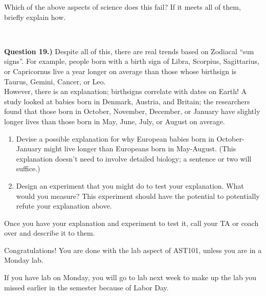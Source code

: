 \documentclass[11pt]{article}
\begin{document}
Which of the above aspects of science does this fail? If it meets all of them, briefly explain how.

\vfill
\hrulefill\\
\newpage


\textbf{Question 19.)} Despite all of this, there {\it} are real trends based on Zodiacal ``sun signs''. For example, people born with a birth sign of Libra, Scorpius, Sagittarius, or Capricornus live a year longer on average than those whose birthsign is Taurus, Gemini, Cancer, or Leo.\\

However, there is an explanation; birthsigns correlate with dates on Earth! A study looked at babies born in Denmark, Austria, and Britain; the researchers found that those born in October, November, December, or January have slightly longer lives than those born in May, June, July, or August on average.



\bigskip


\begin{enumerate}
	\item Devise a possible explanation for why European babies born in October-January might live longer than Europeans born in May-August. (This explanation doesn't need to involve detailed biology; a sentence or two will suffice.)
	\item Design an experiment that you might do to test your explanation. What would you measure? This experiment should have the potential to potentially refute your explanation above.
\end{enumerate}

Once you have your explanation and experiment to test it, call your TA or coach over and describe it to them. 


\vspace{3in}

\vspace{1.5cm}
\hrulefill

\bfseries

Congratulations! You are done with the lab aspect of AST101, unless you are in a Monday lab.

If you have lab on Monday, you will go to lab next week to make up the lab you missed earlier in the semester because of Labor Day. 
\end{document}
